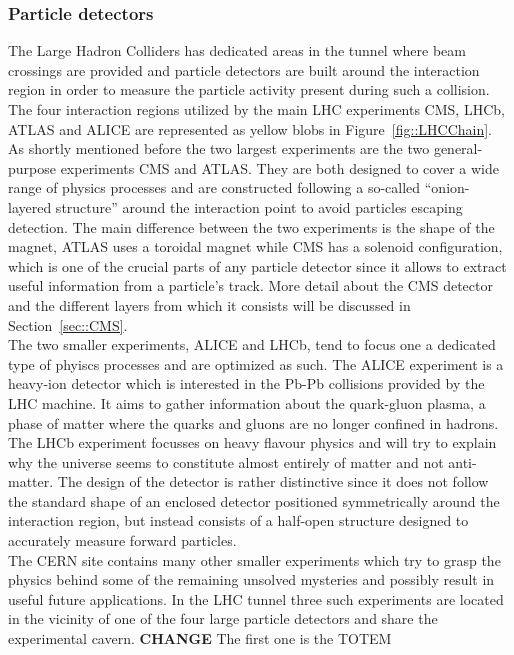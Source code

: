 \subsubsection{Particle detectors}
The Large Hadron Colliders has dedicated areas in the tunnel where beam crossings are provided and particle detectors are built around the interaction region in order to measure the particle activity present during such a collision. The four interaction regions utilized by the main LHC experiments CMS, LHCb, ATLAS and ALICE are represented as yellow blobs in Figure~\ref{fig::LHCChain}. 
\\
As shortly mentioned before the two largest experiments are the two general-purpose experiments CMS and ATLAS. They are both designed to cover a wide range of physics processes and are constructed following a so-called ``onion-layered structure'' around the interaction point to avoid particles escaping detection. The main difference between the two experiments is the shape of the magnet, ATLAS uses a toroidal magnet while CMS has a solenoid configuration, which is one of the crucial parts of any particle detector since it allows to extract useful information from a particle's track. More detail about the CMS detector and the different layers from which it consists will be discussed in Section~\ref{sec::CMS}.
\\
The two smaller experiments, ALICE and LHCb, tend to focus one a dedicated type of phyiscs processes and are optimized as such. The ALICE experiment is a heavy-ion detector which is interested in the Pb-Pb collisions provided by the LHC machine. It aims to gather information about the quark-gluon plasma, a phase of matter where the quarks and gluons are no longer confined in hadrons. The LHCb experiment focusses on heavy flavour physics and will try to explain why the universe seems to constitute almost entirely of matter and not anti-matter. The design of the detector is rather distinctive since it does not follow the standard shape of an enclosed detector positioned symmetrically around the interaction region, but instead consists of a half-open structure designed to accurately measure forward particles.
\\
The CERN site contains many other smaller experiments which try to grasp the physics behind some of the remaining unsolved mysteries and possibly result in useful future applications. In the LHC tunnel three such experiments are located in the vicinity of one of the four large particle detectors and share the experimental cavern. \textbf{CHANGE}
The first one is the TOTEM~\cite{} %
